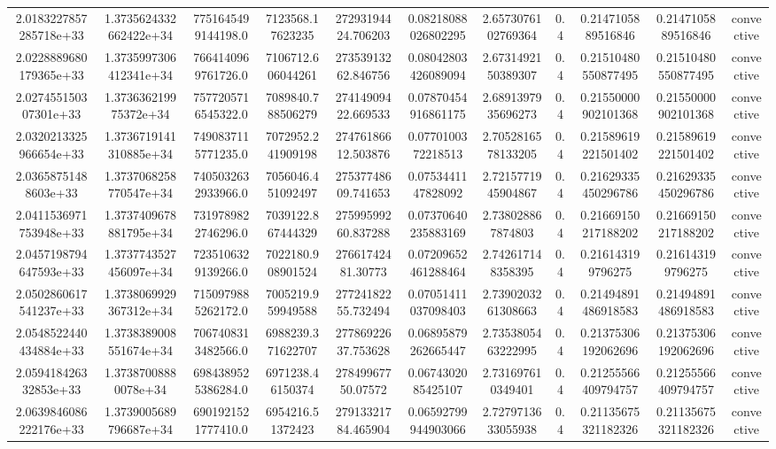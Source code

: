 \begin{table}
\begin{tabular}{ccccccccccc}
2.0183227857285718e+33 & 1.3735624332662422e+34 & 7751645499144198.0 & 7123568.17623235 & 27293194424.706203 & 0.08218088026802295 & 2.6573076102769364 & 0.4 & 0.2147105889516846 & 0.2147105889516846 & convective \\
2.0228889680179365e+33 & 1.3735997306412341e+34 & 7664140969761726.0 & 7106712.606044261 & 27353913262.846756 & 0.08042803426089094 & 2.6731492150389307 & 0.4 & 0.21510480550877495 & 0.21510480550877495 & convective \\
2.027455150307301e+33 & 1.373636219975372e+34 & 7577205716545322.0 & 7089840.788506279 & 27414909422.669533 & 0.07870454916861175 & 2.6891397935696273 & 0.4 & 0.21550000902101368 & 0.21550000902101368 & convective \\
2.0320213325966654e+33 & 1.3736719141310885e+34 & 7490837115771235.0 & 7072952.241909198 & 27476186612.503876 & 0.0770100372218513 & 2.7052816578133205 & 0.4 & 0.21589619221501402 & 0.21589619221501402 & convective \\
2.03658751488603e+33 & 1.3737068258770547e+34 & 7405032632933966.0 & 7056046.451092497 & 27537748609.741653 & 0.0753441147828092 & 2.7215771945904867 & 0.4 & 0.21629335450296786 & 0.21629335450296786 & convective \\
2.0411536971753948e+33 & 1.3737409678881795e+34 & 7319789822746296.0 & 7039122.867444329 & 27599599260.837288 & 0.07370640235883169 & 2.738028867874803 & 0.4 & 0.21669150217188202 & 0.21669150217188202 & convective \\
2.0457198794647593e+33 & 1.3737743527456097e+34 & 7235106329139266.0 & 7022180.908901524 & 27661742481.30773 & 0.07209652461288464 & 2.742617148358395 & 0.4 & 0.216143199796275 & 0.216143199796275 & convective \\
2.0502860617541237e+33 & 1.3738069929367312e+34 & 7150979885262172.0 & 7005219.959949588 & 27724182255.732494 & 0.07051411037098403 & 2.7390203261308663 & 0.4 & 0.21494891486918583 & 0.21494891486918583 & convective \\
2.0548522440434884e+33 & 1.3738389008551674e+34 & 7067408313482566.0 & 6988239.371622707 & 27786922637.753628 & 0.06895879262665447 & 2.7353805463222995 & 0.4 & 0.21375306192062696 & 0.21375306192062696 & convective \\
2.059418426332853e+33 & 1.37387008880078e+34 & 6984389525386284.0 & 6971238.46150374 & 27849967750.07572 & 0.0674302085425107 & 2.731697610349401 & 0.4 & 0.21255566409794757 & 0.21255566409794757 & convective \\
2.0639846086222176e+33 & 1.3739005689796687e+34 & 6901921521777410.0 & 6954216.51372423 & 27913321784.465904 & 0.06592799944903066 & 2.7279713633055938 & 0.4 & 0.21135675321182326 & 0.21135675321182326 & convective \\

\end{tabular}
\end{table}

